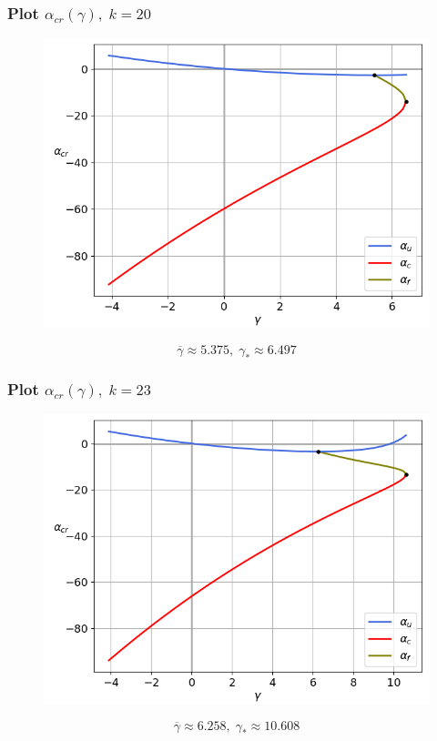 \documentclass[fullscreen=true, unicode, bookmarks=false]{beamer}
\begin{document}
\begin{frame}
\frametitle{ Plot $ \alpha_{cr}(\gamma), \; k = 20 $ }

\begin{figure} 
\includegraphics[scale=0.55]{alphas_039.png}  
\end{figure}
$$ \overline{\gamma} \approx 5.375, \; \gamma_* \approx 6.497 $$

\end{frame}

\begin{frame}
\frametitle{ Plot $ \alpha_{cr}(\gamma), \; k = 23 $ }

\begin{figure} 
\includegraphics[scale=0.55]{alphas_045.png}  
\end{figure}
$$ \overline{\gamma} \approx 6.258, \; \gamma_* \approx 10.608 $$

\end{frame}
\end{document}
